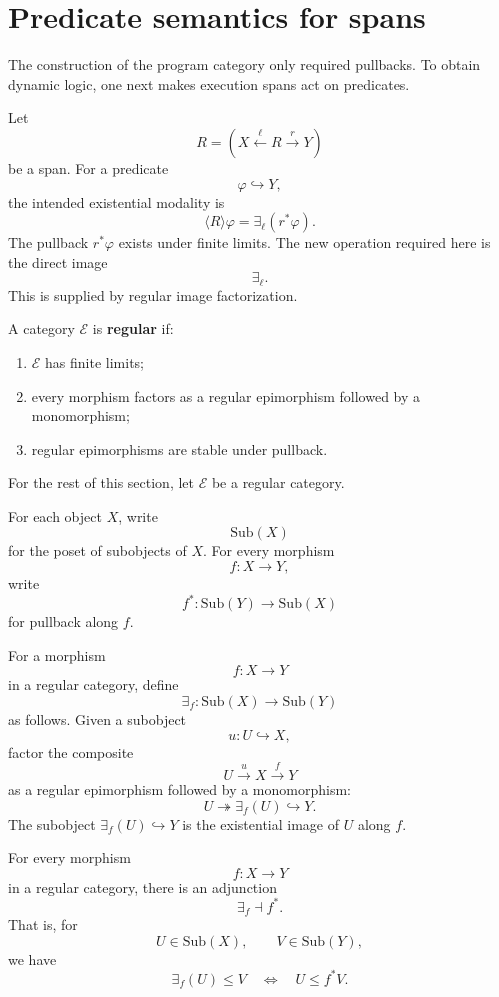\section{Predicate semantics for spans}
\label{sec:predicate-semantics-spans}

The construction of the program category only required pullbacks. To obtain dynamic logic, one next makes execution spans act on predicates.

Let
\[
R=
\left(
X\xleftarrow{\ell}R\xrightarrow{r}Y
\right)
\]
be a span. For a predicate
\[
\varphi\hookrightarrow Y,
\]
the intended existential modality is
\[
\langle R\rangle\varphi
=
\exists_{\ell}(r^\ast\varphi).
\]
The pullback \(r^\ast\varphi\) exists under finite limits. The new operation required here is the direct image
\[
\exists_\ell.
\]
This is supplied by regular image factorization.

\begin{definition}
\label{def:regular-category}
A category \(\mathcal E\) is \textbf{regular} if:
\begin{enumerate}
\item \(\mathcal E\) has finite limits;
\item every morphism factors as a regular epimorphism followed by a monomorphism;
\item regular epimorphisms are stable under pullback.
\end{enumerate}
\end{definition}

For the rest of this section, let \(\mathcal E\) be a regular category.

For each object \(X\), write
\[
\mathrm{Sub}(X)
\]
for the poset of subobjects of \(X\). For every morphism
\[
f:X\to Y,
\]
write
\[
f^\ast:\mathrm{Sub}(Y)\to\mathrm{Sub}(X)
\]
for pullback along \(f\).

\begin{definition}
\label{def:existential-image-regular}
For a morphism
\[
f:X\to Y
\]
in a regular category, define
\[
\exists_f:\mathrm{Sub}(X)\to\mathrm{Sub}(Y)
\]
as follows. Given a subobject
\[
u:U\hookrightarrow X,
\]
factor the composite
\[
U\xrightarrow{u}X\xrightarrow{f}Y
\]
as a regular epimorphism followed by a monomorphism:
\[
U\twoheadrightarrow \exists_f(U)\hookrightarrow Y.
\]
The subobject \(\exists_f(U)\hookrightarrow Y\) is the existential image of \(U\) along \(f\).
\end{definition}

\begin{proposition}
\label{prop:exists-left-adjoint-pullback}
For every morphism
\[
f:X\to Y
\]
in a regular category, there is an adjunction
\[
\exists_f\dashv f^\ast.
\]
That is, for
\[
U\in\mathrm{Sub}(X),
\qquad
V\in\mathrm{Sub}(Y),
\]
we have
\[
\exists_f(U)\le V
\quad\Longleftrightarrow\quad
U\le f^\ast V.
\]
\end{proposition}

